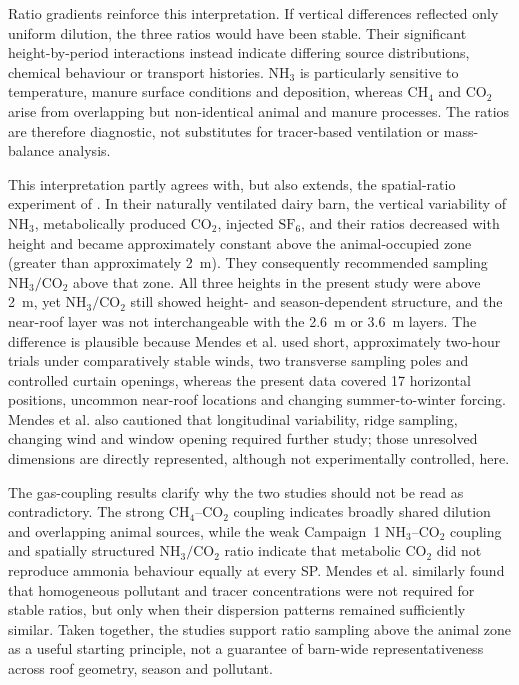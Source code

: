 ﻿\documentclass[12pt,a4paper]{article}
\begin{document}
Ratio gradients reinforce this interpretation. If vertical differences reflected only uniform dilution, the three ratios would have been stable. Their significant height-by-period interactions instead indicate differing source distributions, chemical behaviour or transport histories. \(\mathrm{NH_3}\) is particularly sensitive to temperature, manure surface conditions and deposition, whereas \(\mathrm{CH_4}\) and \(\mathrm{CO_2}\) arise from overlapping but non-identical animal and manure processes. The ratios are therefore diagnostic, not substitutes for tracer-based ventilation or mass-balance analysis.

This interpretation partly agrees with, but also extends, the spatial-ratio experiment of \citet{Mendes2015}. In their naturally ventilated dairy barn, the vertical variability of \(\mathrm{NH_3}\), metabolically produced \(\mathrm{CO_2}\), injected \(\mathrm{SF_6}\), and their ratios decreased with height and became approximately constant above the animal-occupied zone (greater than approximately \SI{2}{m}). They consequently recommended sampling \(\mathrm{NH_3}/\mathrm{CO_2}\) above that zone. All three heights in the present study were above \SI{2}{m}, yet \(\mathrm{NH_3}/\mathrm{CO_2}\) still showed height- and season-dependent structure, and the near-roof layer was not interchangeable with the \SI{2.6}{m} or \SI{3.6}{m} layers. The difference is plausible because Mendes et al. used short, approximately two-hour trials under comparatively stable winds, two transverse sampling poles and controlled curtain openings, whereas the present data covered 17 horizontal positions, uncommon near-roof locations and changing summer-to-winter forcing. Mendes et al. also cautioned that longitudinal variability, ridge sampling, changing wind and window opening required further study; those unresolved dimensions are directly represented, although not experimentally controlled, here.

The gas-coupling results clarify why the two studies should not be read as contradictory. The strong \(\mathrm{CH_4}\)--\(\mathrm{CO_2}\) coupling indicates broadly shared dilution and overlapping animal sources, while the weak Campaign~1 \(\mathrm{NH_3}\)--\(\mathrm{CO_2}\) coupling and spatially structured \(\mathrm{NH_3}/\mathrm{CO_2}\) ratio indicate that metabolic \(\mathrm{CO_2}\) did not reproduce ammonia behaviour equally at every SP. Mendes et al. similarly found that homogeneous pollutant and tracer concentrations were not required for stable ratios, but only when their dispersion patterns remained sufficiently similar. Taken together, the studies support ratio sampling above the animal zone as a useful starting principle, not a guarantee of barn-wide representativeness across roof geometry, season and pollutant.
\end{document}
